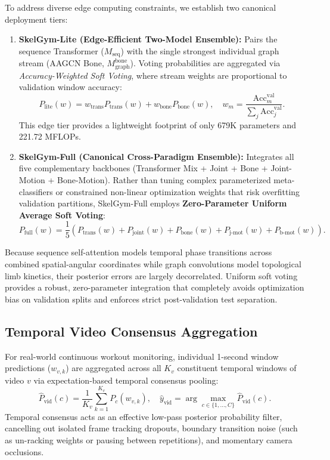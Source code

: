 \documentclass[runningheads]{llncs}
\begin{document}
To address diverse edge computing constraints, we establish two canonical deployment tiers:
\begin{enumerate}
    \item \textbf{SkelGym-Lite (Edge-Efficient Two-Model Ensemble):} Pairs the sequence Transformer ($M_{\text{seq}}$) with the single strongest individual graph stream (AAGCN Bone, $M_{\text{graph}}^{\text{bone}}$). Voting probabilities are aggregated via \textit{Accuracy-Weighted Soft Voting}, where stream weights are proportional to validation window accuracy:
    \begin{equation}
        P_{\text{lite}}(w) = w_{\text{trans}} P_{\text{trans}}(w) + w_{\text{bone}} P_{\text{bone}}(w), \quad w_m = \frac{\text{Acc}_m^{\text{val}}}{\sum_{j} \text{Acc}_j^{\text{val}}}.
    \end{equation}
    This edge tier provides a lightweight footprint of only 679K parameters and 221.72 MFLOPs.
    \item \textbf{SkelGym-Full (Canonical Cross-Paradigm Ensemble):} Integrates all five complementary backbones (Transformer Mix + Joint + Bone + Joint-Motion + Bone-Motion). Rather than tuning complex parameterized meta-classifiers or constrained non-linear optimization weights that risk overfitting validation partitions, SkelGym-Full employs \textbf{Zero-Parameter Uniform Average Soft Voting}:
    \begin{equation}
    \label{eq:uniform_soft}
        P_{\text{full}}(w) = \frac{1}{5} \left( P_{\text{trans}}(w) + P_{\text{joint}}(w) + P_{\text{bone}}(w) + P_{\text{j-mot}}(w) + P_{\text{b-mot}}(w) \right).
    \end{equation}
\end{enumerate}
Because sequence self-attention models temporal phase transitions across combined spatial-angular coordinates while graph convolutions model topological limb kinetics, their posterior errors are largely decorrelated. Uniform soft voting provides a robust, zero-parameter integration that completely avoids optimization bias on validation splits and enforces strict post-validation test separation.

\subsection{Temporal Video Consensus Aggregation}
For real-world continuous workout monitoring, individual 1-second window predictions ($w_{v, k}$) are aggregated across all $K_v$ constituent temporal windows of video $v$ via expectation-based temporal consensus pooling:
\begin{equation}
    \hat{P}_{\text{vid}}(c) = \frac{1}{K_v} \sum_{k=1}^{K_v} P_c(w_{v, k}), \quad \hat{y}_{\text{vid}} = \arg\max_{c \in \{1, \dots, C\}} \hat{P}_{\text{vid}}(c).
\end{equation}
Temporal consensus acts as an effective low-pass posterior probability filter, cancelling out isolated frame tracking dropouts, boundary transition noise (such as un-racking weights or pausing between repetitions), and momentary camera occlusions.
\end{document}
